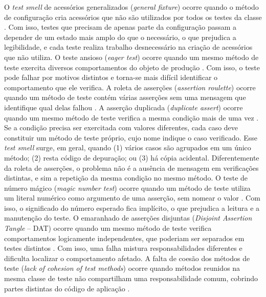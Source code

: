 O \textit{test smell} de acessórios generalizados (\textit{general fixture}) ocorre quando o método de configuração cria acessórios que não são utilizados por todos os testes da classe \cite{vandeursen:etal:2001,greiler:etal:2013:a}. Com isso, testes que precisam de apenas parte da configuração passam a depender de um estado mais amplo do que o necessário, o que prejudica a legibilidade, e cada teste realiza trabalho desnecessário na criação de acessórios que não utiliza. O teste ansioso (\textit{eager test}) ocorre quando um mesmo método de teste exercita diversos comportamentos do objeto de produção \cite{vandeursen:etal:2001}. Com isso, o teste pode falhar por motivos distintos e torna-se mais difícil identificar o comportamento que ele verifica. A roleta de asserções (\textit{assertion roulette}) ocorre quando um método de teste contém várias asserções sem uma mensagem que identifique qual delas falhou \cite{vandeursen:etal:2001}. A asserção duplicada (\textit{duplicate assert}) ocorre quando um mesmo método de teste verifica a mesma condição mais de uma vez \cite{peruma:etal:2020}. Se a condição precisa ser exercitada com valores diferentes, cada caso deve constituir um método de teste próprio, cujo nome indique o caso verificado. Esse \textit{test smell} surge, em geral, quando (1) vários casos são agrupados em um único método; (2) resta código de depuração; ou (3) há cópia acidental. Diferentemente da roleta de asserções, o problema não é a ausência de mensagem em verificações distintas, e sim a repetição da mesma condição no mesmo método. O teste de número mágico (\textit{magic number test}) ocorre quando um método de teste utiliza um literal numérico como argumento de uma asserção, sem nomear o valor \cite{peruma:etal:2020}. Com isso, o significado do número esperado fica implícito, o que prejudica a leitura e a manutenção do teste. O emaranhado de asserções disjuntas (\textit{Disjoint Assertion Tangle} -- DAT) ocorre quando um mesmo método de teste verifica comportamentos logicamente independentes, que poderiam ser separados em testes distintos \cite{narang:etal:2025}. Com isso, uma falha mistura responsabilidades diferentes e dificulta localizar o comportamento afetado. A falta de coesão dos métodos de teste (\textit{lack of cohesion of test methods}) ocorre quando métodos reunidos na mesma classe de teste não compartilham uma responsabilidade comum, cobrindo partes distintas do código de aplicação \cite{greiler:etal:2013:a}.

